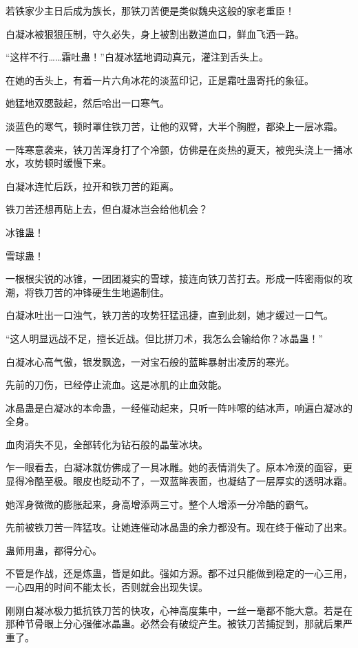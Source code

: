 \begin{this_body}
若铁家少主日后成为族长，那铁刀苦便是类似魏央这般的家老重臣！

白凝冰被狠狠压制，守久必失，身上被割出数道血口，鲜血飞洒一路。

“这样不行……霜吐蛊！”白凝冰猛地调动真元，灌注到舌头上。

在她的舌头上，有着一片六角冰花的淡蓝印记，正是霜吐蛊寄托的象征。

她猛地双腮鼓起，然后哈出一口寒气。

淡蓝色的寒气，顿时罩住铁刀苦，让他的双臂，大半个胸膛，都染上一层冰霜。

一阵寒意袭来，铁刀苦浑身打了个冷颤，仿佛是在炎热的夏天，被兜头浇上一捅冰水，攻势顿时缓慢下来。

白凝冰连忙后跃，拉开和铁刀苦的距离。

铁刀苦还想再贴上去，但白凝冰岂会给他机会？

冰锥蛊！

雪球蛊！

一根根尖锐的冰锥，一团团凝实的雪球，接连向铁刀苦打去。形成一阵密雨似的攻潮，将铁刀苦的冲锋硬生生地遏制住。

白凝冰吐出一口浊气，铁刀苦的攻势狂猛迅捷，直到此刻，她才缓过一口气。

“这人明显远战不足，擅长近战。但比拼刀术，我怎么会输给你？冰晶蛊！”

白凝冰心高气傲，银发飘逸，一对宝石般的蓝眸暴射出凌厉的寒光。

先前的刀伤，已经停止流血。这是冰肌的止血效能。

冰晶蛊是白凝冰的本命蛊，一经催动起来，只听一阵咔嚓的结冰声，响遍白凝冰的全身。

血肉消失不见，全部转化为钻石般的晶莹冰块。

乍一眼看去，白凝冰就仿佛成了一具冰雕。她的表情消失了。原本冷漠的面容，更显得冷酷至极。眼皮也眨动不了，一双蓝眸表面，也凝结了一层厚实的透明冰霜。

她浑身微微的膨胀起来，身高增添两三寸。整个人增添一分冷酷的霸气。

先前被铁刀苦一阵猛攻。让她连催动冰晶蛊的余力都没有。现在终于催动了出来。

蛊师用蛊，都得分心。

不管是作战，还是炼蛊，皆是如此。强如方源。都不过只能做到稳定的一心三用，一心四用的时间不能太长，否则就会出现失误。

刚刚白凝冰极力抵抗铁刀苦的快攻，心神高度集中，一丝一毫都不能大意。若是在那种节骨眼上分心强催冰晶蛊。必然会有破绽产生。被铁刀苦捕捉到，那就后果严重了。


\end{this_body}
